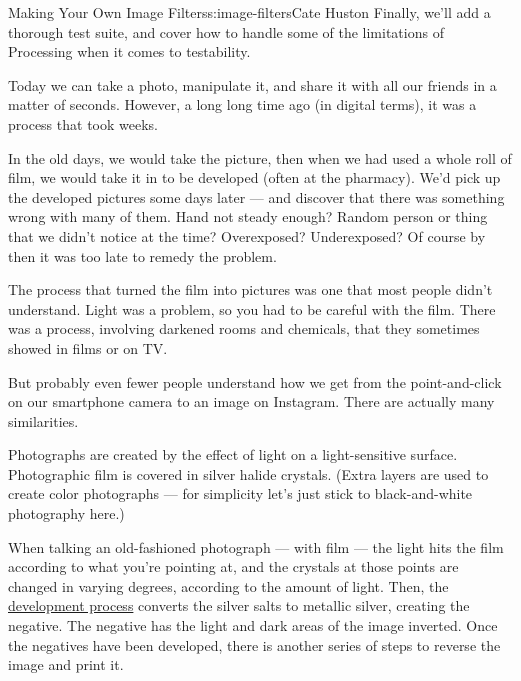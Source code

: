 \begin{aosachapter}{Making Your Own Image Filters}{s:image-filters}{Cate Huston}
Finally, we'll add a thorough test suite, and cover how to handle some
of the limitations of Processing when it comes to testability.

\label{background}

Today we can take a photo, manipulate it, and share it with all our
friends in a matter of seconds. However, a long long time ago (in
digital terms), it was a process that took weeks.

In the old days, we would take the picture, then when we had used a
whole roll of film, we would take it in to be developed (often at the
pharmacy). We'd pick up the developed pictures some days later --- and
discover that there was something wrong with many of them. Hand not
steady enough? Random person or thing that we didn't notice at the time?
Overexposed? Underexposed? Of course by then it was too late to remedy
the problem.

The process that turned the film into pictures was one that most people
didn't understand. Light was a problem, so you had to be careful with
the film. There was a process, involving darkened rooms and chemicals,
that they sometimes showed in films or on TV.

But probably even fewer people understand how we get from the
point-and-click on our smartphone camera to an image on Instagram. There
are actually many similarities.

\label{photographs-the-old-way}

Photographs are created by the effect of light on a light-sensitive
surface. Photographic film is covered in silver halide crystals. (Extra
layers are used to create color photographs --- for simplicity let's
just stick to black-and-white photography here.)

When talking an old-fashioned photograph --- with film --- the light
hits the film according to what you're pointing at, and the crystals at
those points are changed in varying degrees, according to the amount of
light. Then, the
\href{http://photography.tutsplus.com/tutorials/step-by-step-guide-to-developing-black-and-white-t-max-film-{}-photo-2580}{development
process} converts the silver salts to metallic silver, creating the
negative. The negative has the light and dark areas of the image
inverted. Once the negatives have been developed, there is another
series of steps to reverse the image and print it.

\label{photographs-the-digital-way}


\end{aosachapter}
